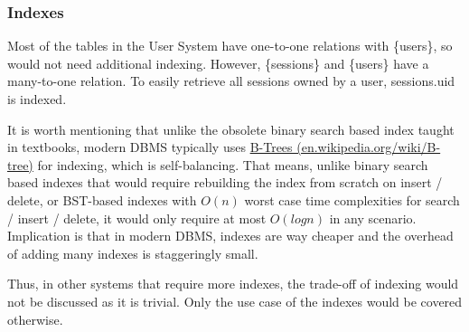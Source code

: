 \documentclass[12pt]{report}
\newcommand{\n}{\par}
\begin{document}
\subsubsection{Indexes} \label{data-layer.design.user-system.indexes}
Most of the tables in the User System have one-to-one relations with \{users\},
so would not need additional indexing.
However, \{sessions\} and \{users\} have a many-to-one relation.
To easily retrieve all sessions owned by a user, sessions.uid is indexed.\n
It is worth mentioning that unlike the obsolete binary search based index taught in textbooks,
modern DBMS typically uses \href{https://en.wikipedia.org/wiki/B-tree}{B-Trees (en.wikipedia.org/wiki/B-tree)} for indexing, which is self-balancing.
That means, unlike binary search based indexes that would require rebuilding the index from scratch on insert / delete,
or BST-based indexes with $O(n)$ worst case time complexities for search / insert / delete,
it would only require at most $O(logn)$ in any scenario.
Implication is that in modern DBMS, indexes are way cheaper and the overhead of adding many indexes is staggeringly small.\n
Thus, in other systems that require more indexes, the trade-off of indexing would not be discussed as it is trivial.
Only the use case of the indexes would be covered otherwise.
\end{document}
